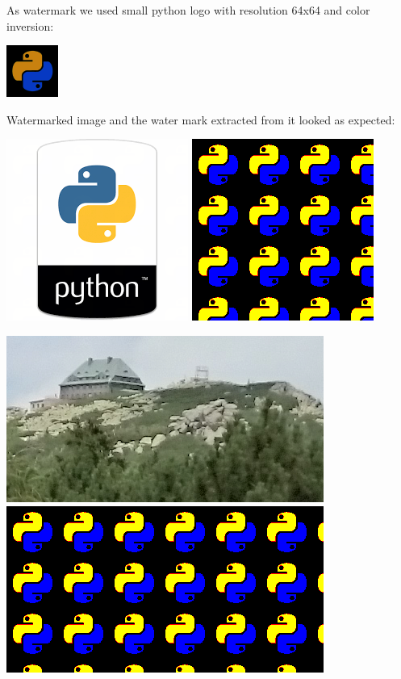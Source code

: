 \documentclass{article}
\begin{document}
        As watermark we used small python logo with resolution 64x64 and color inversion:

    	\includegraphics[scale=1.5]{watermark.png}

        Watermarked image and the water mark extracted from it looked as expected:

    	\includegraphics[scale=1.0]{python_lsb/watermarked_python.png}
    	\includegraphics[scale=1.0]{python_lsb/watermark_photo.png}

    	\includegraphics[scale=0.6]{photo_lsb/watermarked_photo.png}
    	\includegraphics[scale=0.6]{photo_lsb/watermark_photo.png}
\end{document}
